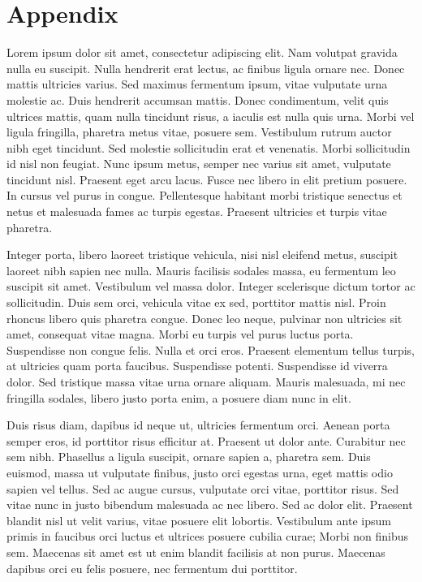 \chapter{Appendix}

Lorem ipsum dolor sit amet, consectetur adipiscing elit. Nam volutpat gravida nulla eu suscipit. Nulla hendrerit erat lectus, ac finibus ligula ornare nec. Donec mattis ultricies varius. Sed maximus fermentum ipsum, vitae vulputate urna molestie ac. Duis hendrerit accumsan mattis. Donec condimentum, velit quis ultrices mattis, quam nulla tincidunt risus, a iaculis est nulla quis urna. Morbi vel ligula fringilla, pharetra metus vitae, posuere sem. Vestibulum rutrum auctor nibh eget tincidunt. Sed molestie sollicitudin erat et venenatis. Morbi sollicitudin id nisl non feugiat. Nunc ipsum metus, semper nec varius sit amet, vulputate tincidunt nisl. Praesent eget arcu lacus. Fusce nec libero in elit pretium posuere. In cursus vel purus in congue. Pellentesque habitant morbi tristique senectus et netus et malesuada fames ac turpis egestas. Praesent ultricies et turpis vitae pharetra.

Integer porta, libero laoreet tristique vehicula, nisi nisl eleifend metus, suscipit laoreet nibh sapien nec nulla. Mauris facilisis sodales massa, eu fermentum leo suscipit sit amet. Vestibulum vel massa dolor. Integer scelerisque dictum tortor ac sollicitudin. Duis sem orci, vehicula vitae ex sed, porttitor mattis nisl. Proin rhoncus libero quis pharetra congue. Donec leo neque, pulvinar non ultricies sit amet, consequat vitae magna. Morbi eu turpis vel purus luctus porta. Suspendisse non congue felis. Nulla et orci eros. Praesent elementum tellus turpis, at ultricies quam porta faucibus. Suspendisse potenti. Suspendisse id viverra dolor. Sed tristique massa vitae urna ornare aliquam. Mauris malesuada, mi nec fringilla sodales, libero justo porta enim, a posuere diam nunc in elit.

Duis risus diam, dapibus id neque ut, ultricies fermentum orci. Aenean porta semper eros, id porttitor risus efficitur at. Praesent ut dolor ante. Curabitur nec sem nibh. Phasellus a ligula suscipit, ornare sapien a, pharetra sem. Duis euismod, massa ut vulputate finibus, justo orci egestas urna, eget mattis odio sapien vel tellus. Sed ac augue cursus, vulputate orci vitae, porttitor risus. Sed vitae nunc in justo bibendum malesuada ac nec libero. Sed ac dolor elit. Praesent blandit nisl ut velit varius, vitae posuere elit lobortis. Vestibulum ante ipsum primis in faucibus orci luctus et ultrices posuere cubilia curae; Morbi non finibus sem. Maecenas sit amet est ut enim blandit facilisis at non purus. Maecenas dapibus orci eu felis posuere, nec fermentum dui porttitor.


